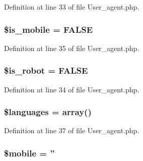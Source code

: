 Definition at line 33 of file User\-\_\-agent.\-php.

\hypertarget{class_c_i___user__agent_a15f8c9cdaac57894151997b80f38224d}{
\subsubsection[{\$is\-\_\-mobile}]{\setlength{\rightskip}{0pt plus 5cm}\${\bf is\-\_\-mobile} = F\-A\-L\-S\-E}}\label{class_c_i___user__agent_a15f8c9cdaac57894151997b80f38224d}


Definition at line 35 of file User\-\_\-agent.\-php.

\hypertarget{class_c_i___user__agent_a4b3d4b92832b15f313661bc9af0323fa}{
\subsubsection[{\$is\-\_\-robot}]{\setlength{\rightskip}{0pt plus 5cm}\${\bf is\-\_\-robot} = F\-A\-L\-S\-E}}\label{class_c_i___user__agent_a4b3d4b92832b15f313661bc9af0323fa}


Definition at line 34 of file User\-\_\-agent.\-php.

\hypertarget{class_c_i___user__agent_a8856d0a49881ef8e0a6d205d37d4a7af}{
\subsubsection[{\$languages}]{\setlength{\rightskip}{0pt plus 5cm}\${\bf languages} = array()}}\label{class_c_i___user__agent_a8856d0a49881ef8e0a6d205d37d4a7af}


Definition at line 37 of file User\-\_\-agent.\-php.

\hypertarget{class_c_i___user__agent_a4144d0c9c54f204811328b221f06fc3d}{
\subsubsection[{\$mobile}]{\setlength{\rightskip}{0pt plus 5cm}\${\bf mobile} = ''}}\label{class_c_i___user__agent_a4144d0c9c54f204811328b221f06fc3d}


